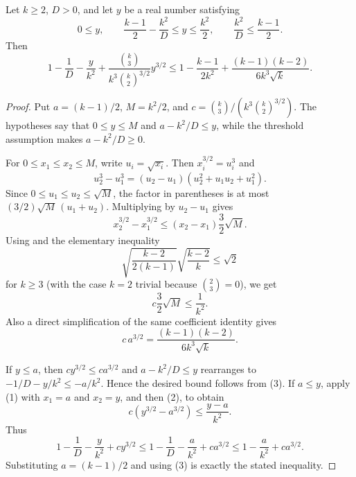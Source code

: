 \begin{helper}
Let $k\ge2$, $D>0$, and let $y$ be a real number satisfying
\[
0\le y,\qquad
\frac{k-1}{2}-\frac{k^2}{D}\le y\le \frac{k^2}{2},
\qquad
\frac{k^2}{D}\le \frac{k-1}{2}.
\]
Then
\[
1-\frac1D-\frac{y}{k^2}
+\frac{\binom{k}{3}}{k^3\binom{k}{2}^{3/2}}y^{3/2}
\le
1-\frac{k-1}{2k^2}
+\frac{(k-1)(k-2)}{6k^3\sqrt{k}} .
\]
\end{helper}
\begin{proof}
Put $a=(k-1)/2$, $M=k^2/2$, and
$c=\binom{k}{3}/(k^3\binom{k}{2}^{3/2})$.  The hypotheses say that
$0\le y\le M$ and $a-k^2/D\le y$, while the threshold assumption makes
$a-k^2/D\ge0$.

For $0\le x_1\le x_2\le M$, write $u_i=\sqrt{x_i}$.  Then
$x_i^{3/2}=u_i^3$ and
\[
u_2^3-u_1^3=(u_2-u_1)(u_2^2+u_1u_2+u_1^2).
\]
Since $0\le u_1\le u_2\le\sqrt M$, the factor in parentheses is at most
$(3/2)\sqrt M\,(u_1+u_2)$.  Multiplying by $u_2-u_1$ gives
\[
x_2^{3/2}-x_1^{3/2}
\le (x_2-x_1)\frac32\sqrt M. \tag{1}
\]
Using  and the elementary
inequality
\[
\sqrt{\frac{k-2}{2(k-1)}}\sqrt{\frac{k-2}{k}}\le \sqrt2
\]
for $k\ge3$ (with the case $k=2$ trivial because $\binom 23=0$), we get
\[
c\frac32\sqrt M\le \frac1{k^2}. \tag{2}
\]
Also a direct simplification of the same coefficient identity gives
\[
c\,a^{3/2}
=\frac{(k-1)(k-2)}{6k^3\sqrt{k}}. \tag{3}
\]

If $y\le a$, then $c y^{3/2}\le c a^{3/2}$ and
$a-k^2/D\le y$ rearranges to
$-1/D-y/k^2\le -a/k^2$.  Hence the desired bound follows from (3).
If $a\le y$, apply (1) with $x_1=a$ and $x_2=y$, and then (2), to obtain
\[
c(y^{3/2}-a^{3/2})\le \frac{y-a}{k^2}.
\]
Thus
\[
1-\frac1D-\frac{y}{k^2}+c y^{3/2}
\le 1-\frac1D-\frac{a}{k^2}+c a^{3/2}
\le 1-\frac{a}{k^2}+c a^{3/2}.
\]
Substituting $a=(k-1)/2$ and using (3) is exactly the stated inequality.
\end{proof}

